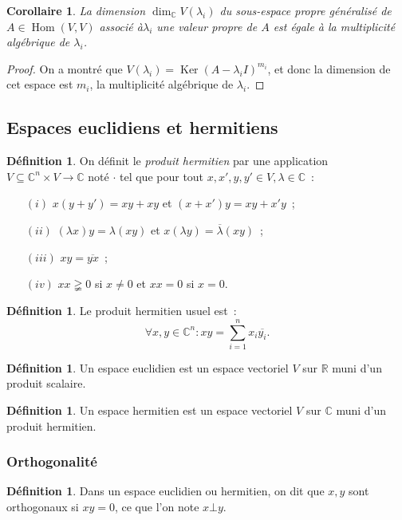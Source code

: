 \documentclass{article}
\DeclareMathOperator{\Ker}{Ker}
\DeclareMathOperator{\Hom}{Hom}
\newcommand{\R}{\mathbb R}
\newcommand{\C}{\mathbb C}
\newcommand{\conj}[1]{\overline {#1}}
\newtheorem{cor}[thm]{Corollaire}
\theoremstyle{definition}
\newtheorem{déf}[thm]{Définition}
\theoremstyle{remark}
\begin{document}
		\begin{cor} La dimension $\dim_\C V(\lambda_i)$ du sous-espace propre généralisé de $A \in \Hom(V, V)$ associé à$\lambda_i$ une valeur propre de $A$
		est égale à la multiplicité algébrique de $\lambda_i$.
		\end{cor}

		\begin{proof} On a montré que $V(\lambda_i) = \Ker(A-\lambda_i I)^{m_i}$, et donc la dimension de cet espace est $m_i$, la multiplicité algébrique de
		$\lambda_i$.
		\end{proof}

	\subsection{Espaces euclidiens et hermitiens}
		\begin{déf} On définit le \emph{produit hermitien} par une application $V \subseteq \C^n \times V \to \C$ noté $\cdot$ tel que pour tout
		$x, x', y, y' \in V, \lambda \in \C$~:
		\begin{itemize}
			\item[$(i)$]   $x(y+y') = xy + xy$ et $(x+x')y = xy + x'y$~;
			\item[$(ii)$]  $(\lambda x)y = \lambda(xy)$ et $x(\lambda y) = \conj \lambda(xy)$~;
			\item[$(iii)$] $xy = \conj {yx}$~;
			\item[$(iv)$]  $xx \gneqq 0$ si $x \neq 0$ et $xx = 0$ si $x = 0$.
		\end{itemize}
		\end{déf}

		\begin{déf} Le produit hermitien usuel est~:
		\[\forall x, y \in \C^n : xy = \sum_{i=1}^nx_i\conj {y_i}.\]
		\end{déf}

		\begin{déf} Un espace euclidien est un espace vectoriel $V$ sur $\R$ muni d'un produit scalaire.
		\end{déf}

		\begin{déf} Un espace hermitien est un espace vectoriel $V$ sur $\C$ muni d'un produit hermitien.
		\end{déf}

		\subsubsection{Orthogonalité}
		\begin{déf} Dans un espace euclidien ou hermitien, on dit que $x, y$ sont orthogonaux si $xy = 0$, ce que l'on note $x \bot y$.
		\end{déf}
\end{document}
